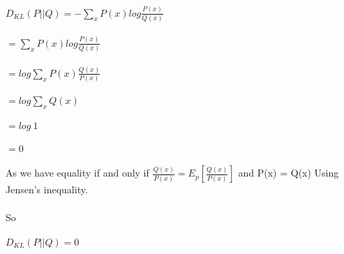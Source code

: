 \newcommand\tab[1][1cm]{\hspace*{#1}}
\begin{answer}
\\ \\
\tab $D_{KL}(P||Q) = -\sum_x P(x)log\frac{P(x)}{Q(x)}$ \\ \\
\tab[3cm] $  = \sum_x P(x)log\frac{P(x)}{Q(x)}$ \\  \\
\tab[3cm] $  = log \sum_x P(x)\frac{Q(x)}{P(x)}$ \\ \\
\tab[3cm] $  = log \sum_x Q(x)$ \\ \\
\tab[3cm] $  = log \ 1$ \\ \\
\tab[3cm] $   = 0$ \\ \\
As we have equality if and only if $\frac{Q(x)}{P(x)} = E_p[\frac{Q(x)}{P(x)}]$  and  P(x) = Q(x) Using Jensen's inequality. \\ \\ 
So \\ \\
\tab $D_{KL}(P||Q) = 0$ \\ \\
\end{answer}
